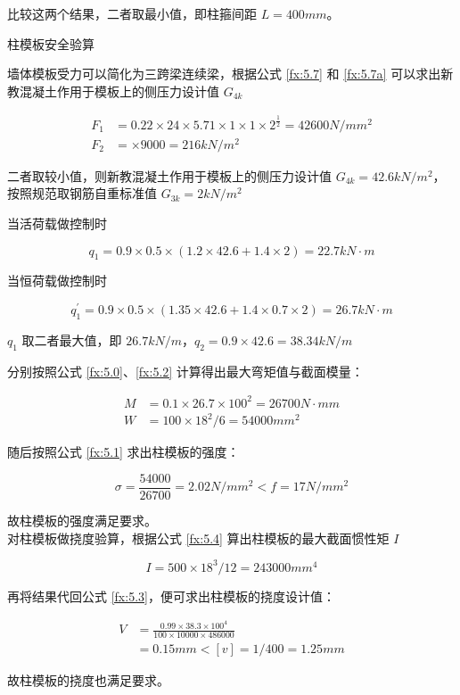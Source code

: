 比较这两个结果，二者取最小值，即柱箍间距 $L=400mm$。

 柱模板安全验算

墙体模板受力可以简化为三跨梁连续梁，根据公式 \ref{fx:5.7} 和 \ref{fx:5.7a} 可以求出新教混凝土作用于模板上的侧压力设计值 $G_{4k}$

\begin{align*}
    F_1&=0.22\times 24\times 5.71\times 1\times 1\times 2^{\frac{1}{2}}=42600 N/mm^2\\
    F_2&=\times 9000=216 kN/m^2
\end{align*}

二者取较小值，则新教混凝土作用于模板上的侧压力设计值 $G_{4k}=42.6 kN/m^2$，按照规范取钢筋自重标准值 $G_{3k}=2kN/m^2$

当活荷载做控制时

\[q_1=0.9\times 0.5\times (1.2\times 42.6+1.4\times 2)=22.7kN \cdot m\]

当恒荷载做控制时

\[q_1^{'}=0.9\times 0.5\times (1.35\times 42.6+1.4\times 0.7\times 2)=26.7kN \cdot m\]

$q_1$ 取二者最大值，即 $26.7 kN/m$，$q_2=0.9\times 42.6=38.34 kN/m$

分别按照公式 \ref{fx:5.0}、\ref{fx:5.2} 计算得出最大弯矩值与截面模量：

\begin{align*}
    M&=0.1\times 26.7\times 100^2=26700 N \cdot mm\\
    W&=100\times 18^2 /6=54000 mm^2
\end{align*}

随后按照公式 \ref{fx:5.1} 求出柱模板的强度：

\[
    \sigma = \frac{54000}{26700}=2.02 N/mm^2< f=17N/mm^2
\]

故柱模板的强度满足要求。\\

对柱模板做挠度验算，根据公式 \ref{fx:5.4} 算出柱模板的最大截面惯性矩 $I$

\[
    I=500\times 18^3 /12=243000 mm^4
\]

再将结果代回公式 \ref{fx:5.3}，便可求出柱模板的挠度设计值：

\begin{align*}
    V&=\frac{0.99\times 38.3 \times 100^4}{100\times 10000\times 486000}\\
    &=0.15 mm<[v]=1/400=1.25mm
\end{align*}

故柱模板的挠度也满足要求。\\

